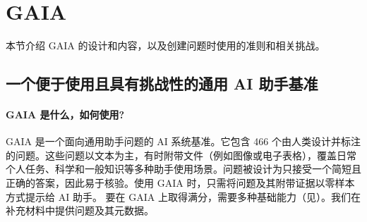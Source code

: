 \documentclass{fairmeta}
\newcommand{\benchmark}{\textsc{GAIA}}
\newcommand{\total}{466}
\begin{document}
\section{\benchmark{}}

本节介绍 \benchmark{} 的设计和内容，以及创建问题时使用的准则和相关挑战。

\subsection{一个便于使用且具有挑战性的通用 AI 助手基准}

\paragraph{\benchmark{} 是什么，如何使用?} \benchmark{} 是一个面向通用助手问题的 AI 系统基准。它包含 \total{} 个由人类设计并标注的问题。这些问题以文本为主，有时附带文件（例如图像或电子表格），覆盖日常个人任务、科学和一般知识等多种助手使用场景。问题被设计为只接受一个简短且正确的答案，因此易于核验。使用 \benchmark{} 时，只需将问题及其附带证据以零样本方式提示给 AI 助手。
要在 \benchmark{} 上取得满分，需要多种基础能力（见）。我们在补充材料中提供问题及其元数据。
\end{document}
